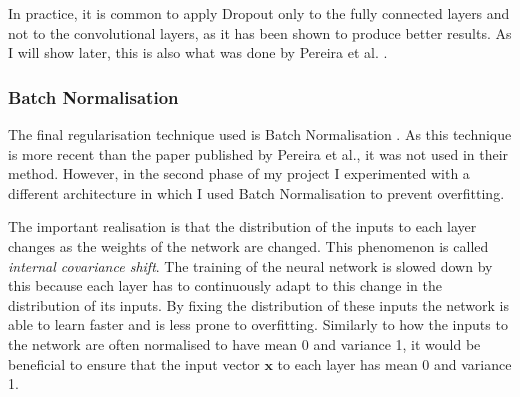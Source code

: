 \documentclass[12pt,a4paper,twoside,openright]{report}
\begin{document}
In practice, it is common to apply Dropout only to the fully connected layers and not to the convolutional layers, as it has been shown to produce better results. As I will show later, this is also what was done by Pereira et al. \cite{pereira}.

\subsubsection{Batch Normalisation}
The final regularisation technique used is Batch Normalisation \cite{batch_normalization}. As this technique is more recent than the paper published by Pereira et al., it was not used in their method. However, in the second phase of my project I experimented with a different architecture in which I used Batch Normalisation to prevent overfitting.

The important realisation is that the distribution of the inputs to each layer changes as the weights of the network are changed. This phenomenon is called \textit{internal covariance shift}. The training of the neural network is slowed down by this because each layer has to continuously adapt to this change in the distribution of its inputs. By fixing the distribution of these inputs the network is able to learn faster and is less prone to overfitting. Similarly to how the inputs to the network are often normalised to have mean 0 and variance 1, it would be beneficial to ensure that the input vector $\textbf{x}$ to each layer has mean 0 and variance 1. 
\end{document}
